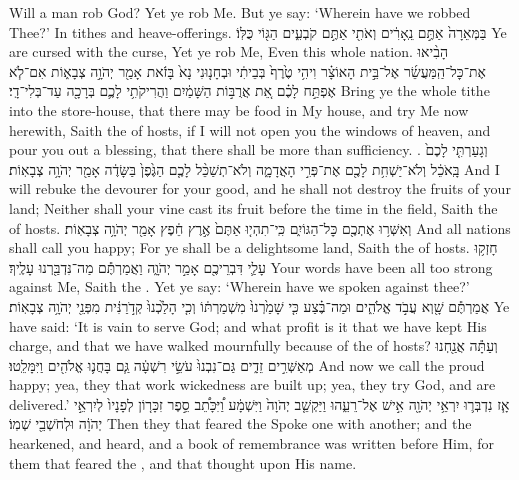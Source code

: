 \documentclass[11pt, openany]{book}
\begin{document}
{Will a man rob God? Yet ye rob Me. But ye say: ‘Wherein have we robbed Thee?’ In tithes and heave-offerings.}
{בַּמְּאֵרָה֙ אַתֶּ֣ם נֵֽאָרִ֔ים וְאֹתִ֖י אַתֶּ֣ם קֹבְעִ֑ים הַגּ֖וֹי כֻּלּֽוֹ׃}
{Ye are cursed with the curse, Yet ye rob Me, Even this whole nation.}
{הָבִ֨יאוּ אֶת־כׇּל־הַֽמַּעֲשֵׂ֜ר אֶל־בֵּ֣ית הָאוֹצָ֗ר וִיהִ֥י טֶ֙רֶף֙ בְּבֵיתִ֔י וּבְחָנ֤וּנִי נָא֙ בָּזֹ֔את אָמַ֖ר יְהֹוָ֣ה צְבָא֑וֹת אִם־לֹ֧א אֶפְתַּ֣ח לָכֶ֗ם אֵ֚ת אֲרֻבּ֣וֹת הַשָּׁמַ֔יִם וַהֲרִיקֹתִ֥י לָכֶ֛ם בְּרָכָ֖ה עַד־בְּלִי־דָֽי׃}
{Bring ye the whole tithe into the store-house, that there may be food in My house, and try Me now herewith, Saith the \lord\space of hosts, if I will not open you the windows of heaven, and pour you out a blessing, that there shall be more than sufficiency. .}
{וְגָעַרְתִּ֤י לָכֶם֙ בָּֽאֹכֵ֔ל וְלֹא־יַשְׁחִ֥ת לָכֶ֖ם אֶת־פְּרִ֣י הָאֲדָמָ֑ה וְלֹא־תְשַׁכֵּ֨ל לָכֶ֤ם הַגֶּ֙פֶן֙ בַּשָּׂדֶ֔ה אָמַ֖ר יְהֹוָ֥ה צְבָאֽוֹת׃}
{And I will rebuke the devourer for your good, and he shall not destroy the fruits of your land; Neither shall your vine cast its fruit before the time in the field, Saith the \lord\space of hosts.}
{וְאִשְּׁר֥וּ אֶתְכֶ֖ם כׇּל־הַגּוֹיִ֑ם כִּֽי־תִהְי֤וּ אַתֶּם֙ אֶ֣רֶץ חֵ֔פֶץ אָמַ֖ר יְהֹוָ֥ה צְבָאֽוֹת׃ \petucha }
{And all nations shall call you happy; For ye shall be a delightsome land, Saith the \lord\space of hosts.}
{חָזְק֥וּ עָלַ֛י דִּבְרֵיכֶ֖ם אָמַ֣ר יְהֹוָ֑ה וַאֲמַרְתֶּ֕ם מַה־נִּדְבַּ֖רְנוּ עָלֶֽיךָ׃}
{Your words have been all too strong against Me, Saith the \lord. Yet ye say: ‘Wherein have we spoken against thee?’}
{אֲמַרְתֶּ֕ם שָׁ֖וְא עֲבֹ֣ד אֱלֹהִ֑ים וּמַה־בֶּ֗צַע כִּ֤י שָׁמַ֙רְנוּ֙ מִשְׁמַרְתּ֔וֹ וְכִ֤י הָלַ֙כְנוּ֙ קְדֹ֣רַנִּ֔ית מִפְּנֵ֖י יְהֹוָ֥ה צְבָאֽוֹת׃}
{Ye have said: ‘It is vain to serve God; and what profit is it that we have kept His charge, and that we have walked mournfully because of the \lord\space of hosts?}
{וְעַתָּ֕ה אֲנַ֖חְנוּ מְאַשְּׁרִ֣ים זֵדִ֑ים גַּם־נִבְנוּ֙ עֹשֵׂ֣י רִשְׁעָ֔ה גַּ֧ם בָּחֲנ֛וּ אֱלֹהִ֖ים וַיִּמָּלֵֽטוּ׃}
{And now we call the proud happy; yea, they that work wickedness are built up; yea, they try God, and are delivered.’}
{אָ֧ז נִדְבְּר֛וּ יִרְאֵ֥י יְהֹוָ֖ה אִ֣ישׁ אֶל־רֵעֵ֑הוּ וַיַּקְשֵׁ֤ב יְהֹוָה֙ וַיִּשְׁמָ֔ע וַ֠יִּכָּתֵ֠ב סֵ֣פֶר זִכָּר֤וֹן לְפָנָיו֙ לְיִרְאֵ֣י יְהֹוָ֔ה וּלְחֹשְׁבֵ֖י שְׁמֽוֹ׃}
{Then they that feared the \lord\space Spoke one with another; and the \lord\space hearkened, and heard, and a book of remembrance was written before Him, for them that feared the \lord, and that thought upon His name.}
\end{document}
